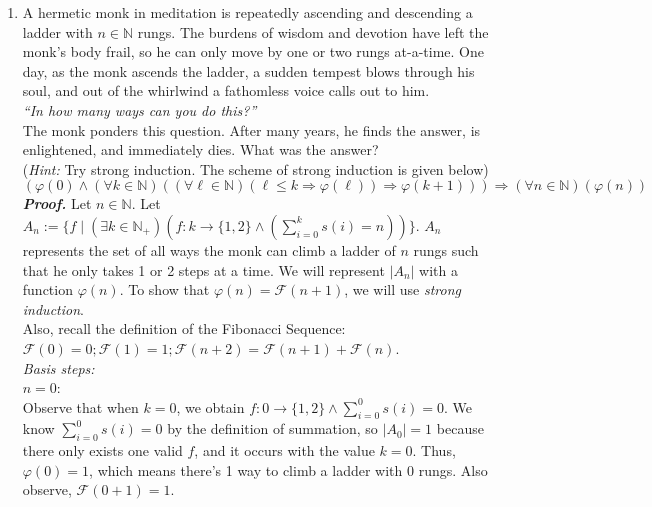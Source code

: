 \documentclass[11pt,a4paper]{article}
\begin{document}
\begin{enumerate}
    \item 
    A hermetic monk in meditation is repeatedly ascending and descending a ladder with $n \in \mathbb{N}$ rungs. 
    The burdens of wisdom and devotion have left the monk's body frail, so he can only move by one or two rungs at-a-time. One day, as the monk ascends the ladder, a sudden tempest blows through his soul, and out of the whirlwind a fathomless voice calls out to him. \\
    \emph{``In how many ways can you do this?''} \\
    The monk ponders this question. After many years, he finds the answer, is enlightened, and immediately dies. What was the answer? \\
    (\emph{Hint:} Try strong induction. The scheme of strong induction is given below)
    \begin{equation*}
        \left(\varphi(0) \land
          \left(\forall k \in \mathbb{N}\right)
          \left(\left(\forall \ell \in \mathbb{N}\right)
            \left(\ell \leq k \Rightarrow \varphi\left(\ell\right)\right)
        \Rightarrow \varphi(k + 1)\right)\right)
        \Rightarrow \left(\forall n \in \mathbb{N}\right)\left(\varphi(n)\right)
    \end{equation*} 
    \emph{\textbf{Proof.}} 
    Let $n \in \mathbb{N} $. Let $A_n := \{f \mid (\exists k \in \mathbb{N}_+)(f: k \rightarrow \{1, 2\} \land (\sum_{i=0}^{k}s(i) = n)) \} $. 
    $A_n$ represents the set of all ways the monk can climb a ladder of $n$ rungs such that he only takes 1 or 2 steps at a time. We will represent $|A_n|  $ with a function $\varphi(n)  $. 
    To show that $\varphi(n) = \mathcal{F}(n + 1) $, we will use \emph{strong induction}. \\
    Also, recall the definition of the Fibonacci Sequence: \\ 
    $\mathcal{F}(0) = 0; \mathcal{F}(1) = 1; \mathcal{F}(n + 2) = \mathcal{F}(n + 1) + \mathcal{F}(n) $.  \\
    \emph{Basis steps:} \\
    $n = 0$: \\
    Observe that when $k = 0$, we obtain $f: 0 \rightarrow \{1, 2\} \land \sum_{i=0}^{0}s(i) = 0$. We know $\sum_{i=0}^{0}s(i) = 0  $ by the definition of summation,
    so $|A_0| = 1 $ because there only exists one valid $f$, and it occurs with the value $k = 0$. Thus, $\varphi(0) = 1 $, which means there's 1 way to climb a ladder with 0 rungs. Also observe, $\mathcal{F}(0 + 1) = 1 $.   \\

\end{enumerate}
\end{document}
